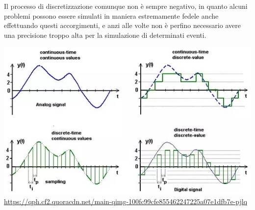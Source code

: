 Il processo di discretizzazione comunque non è sempre negativo, 
in quanto alcuni problemi possono essere simulati in maniera 
estremamente fedele anche effettuando questi accorgimenti, e anzi
alle volte non è perfino necessario avere una precisione troppo 
alta per la simulazione di determinati eventi.

\begin{minipage}{\linewidth}
    \centering
    \includegraphics[scale=0.5]{img/main-qimg-100fc99cfe855462247225a07e1dfb7e-pjlq.jpg}
    \url{https://qph.cf2.quoracdn.net/main-qimg-100fc99cfe855462247225a07e1dfb7e-pjlq}
    \label{fig:discretization}
\end{minipage}
